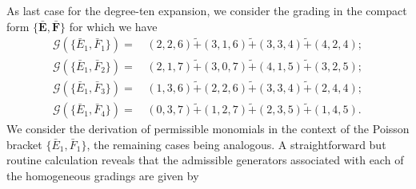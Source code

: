 \documentclass[10pt]{amsart}
\theoremstyle{definition}
\theoremstyle{corollary}
\theoremstyle{remark}
\theoremstyle{conclusion}
\begin{document}
As last case for the degree-ten expansion, we consider the grading in the compact form $\{\bar{\textbf{E}} ,\bar{\textbf{F}}\}$ for which we have  \begin{align}
    \mathcal{G} (\{\bar{E}_1, \bar{F}_1\}) = & \, (2,2,6) \tilde{+} (3,1,6) \tilde{+}   (3,3,4) \tilde{+} (4,2,4) ; \nonumber \\
     \mathcal{G} (\{\bar{E}_1, \bar{F}_2\}) = & \, (2,1,7) \tilde{+} (3,0,7) \tilde{+} (4,1,5) \tilde{+} (3,2,5); \nonumber \\
      \mathcal{G} (\{\bar{E}_1, \bar{F}_3\}) = & \, (1,3,6) \tilde{+} (2,2,6) \tilde{+} (3,3,4) \tilde{+} (2,4,4); \nonumber  \\
       \mathcal{G} (\{\bar{E}_1, \bar{F}_4\}) = & \, (0,3,7) \tilde{+} (1,2,7) \tilde{+} (2,3,5) \tilde{+} (1,4,5).  
\end{align} 
 We consider the derivation of permissible monomials in the context of the Poisson bracket $\{\bar{E}_1,\bar{F}_1\}$, the remaining cases being analogous. A straightforward but routine calculation reveals that the admissible generators associated with each of the homogeneous gradings are given by 
\end{document}
